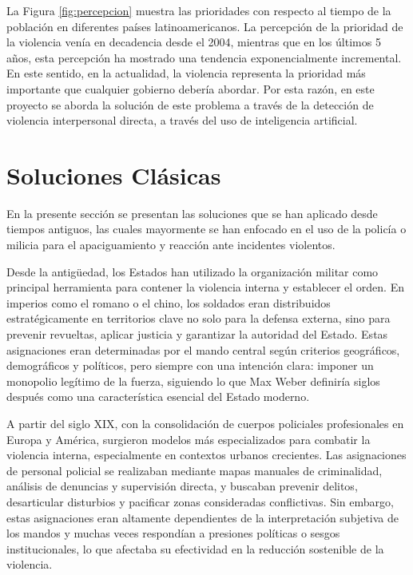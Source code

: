 La Figura \ref{fig:percepcion} muestra las prioridades con 
respecto al tiempo de la población en diferentes países 
latinoamericanos. La percepción de la prioridad de la violencia 
venía en decadencia desde el 2004, mientras que en los 
últimos 5 años, esta percepción ha mostrado una tendencia 
exponencialmente incremental. En este sentido, en la actualidad, 
la violencia representa la prioridad más importante que 
cualquier gobierno debería abordar. Por esta razón, en este 
proyecto se aborda la solución de este problema a través de la
detección de violencia interpersonal directa, a través del uso 
de inteligencia artificial. 

\section{Soluciones Clásicas}\label{solucionesClásicas}

En la presente sección se presentan las soluciones que se 
han aplicado desde tiempos antiguos, las cuales mayormente 
se han enfocado en el uso de la policía o milicia para el 
apaciguamiento y reacción ante incidentes violentos. 

Desde la antigüedad, los Estados han utilizado la organización 
militar como principal herramienta para contener la violencia 
interna y establecer el orden. En imperios como el romano o 
el chino, los soldados eran distribuidos estratégicamente en 
territorios clave no solo para la defensa externa, sino para 
prevenir revueltas, aplicar justicia y garantizar la autoridad 
del Estado\cite{Gilliver2005}. Estas asignaciones eran 
determinadas por el mando central según criterios geográficos, 
demográficos y políticos, pero siempre con una intención 
clara: imponer un monopolio legítimo de la fuerza, siguiendo 
lo que Max Weber definiría siglos después como una característica 
esencial del Estado moderno.

A partir del siglo XIX, con la consolidación de cuerpos policiales 
profesionales en Europa y América, surgieron modelos más 
especializados para combatir la violencia interna, 
especialmente en contextos urbanos crecientes. Las 
asignaciones de personal policial se realizaban mediante 
mapas manuales de criminalidad, análisis de denuncias y 
supervisión directa, y buscaban prevenir delitos, 
desarticular disturbios y pacificar zonas consideradas 
conflictivas\cite{Emsley2007}. Sin embargo, estas asignaciones 
eran altamente dependientes de la interpretación subjetiva 
de los mandos y muchas veces respondían a presiones políticas 
o sesgos institucionales, lo que afectaba su efectividad en 
la reducción sostenible de la violencia.

